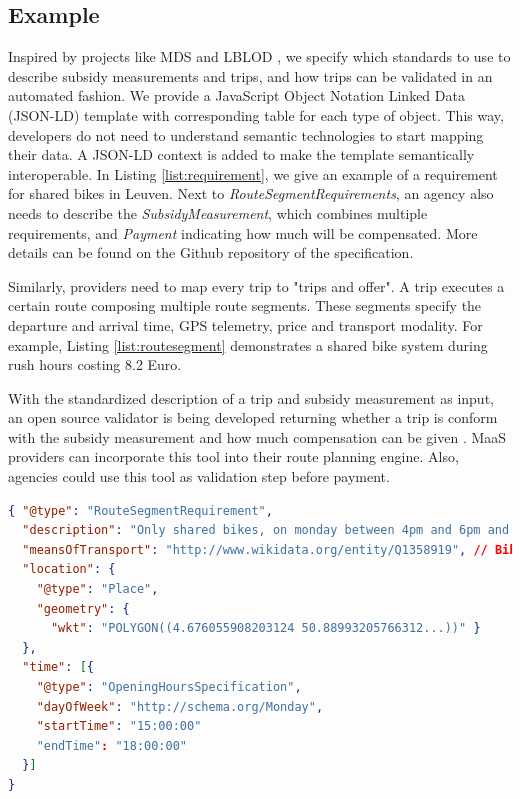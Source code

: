 \documentclass[runningheads]{llncs}
\begin{document}
\subsection{Example}

Inspired by projects like MDS \cite{mds} and LBLOD \cite{subsidymeasurement}, we specify which standards to use to describe subsidy measurements and trips, and how trips can be validated in an automated fashion. We provide a JavaScript Object Notation Linked Data (JSON-LD) template with corresponding table for each type of object. 
This way, developers do not need to understand semantic technologies to start mapping their data. A JSON-LD context is added to make the template semantically interoperable. 
In Listing \ref{list:requirement}, we give an example of a requirement for shared bikes in Leuven. Next to \emph{RouteSegmentRequirements}, an  agency also needs to describe the \emph{SubsidyMeasurement}, which combines multiple requirements, and \emph{Payment} indicating how much will be compensated. More details can be found on the Github repository of the specification\cite{tpp}. 

Similarly, providers need to map every trip to "trips and offer"\cite{tripsandoffer}. A trip executes a certain route composing multiple route segments. These segments specify the departure and arrival time, GPS telemetry, price and transport modality. For example, Listing  \ref{list:routesegment} demonstrates a shared bike system during rush hours costing 8.2 Euro. 

With the standardized description of a trip and subsidy measurement as input, an open source validator is being developed returning whether a trip is conform with the subsidy measurement and how much compensation can be given \cite{tpp}. MaaS providers can incorporate this tool into their route planning engine. Also, agencies could use this tool as validation step before payment.

\begin{lstlisting}[language=json, caption={Travellers are eligible for a subsidy measurement when they use a shared bicycle within the centre of Leuven and on a monday during rush hours.}, label={list:requirement}
]
{ "@type": "RouteSegmentRequirement",
  "description": "Only shared bikes, on monday between 4pm and 6pm and used in the city centre of Leuven.",
  "meansOfTransport": "http://www.wikidata.org/entity/Q1358919", // Bike
  "location": {
  	"@type": "Place",
    "geometry": {
      "wkt": "POLYGON((4.676055908203124 50.88993205766312...))" }
  },
  "time": [{
    "@type": "OpeningHoursSpecification",
    "dayOfWeek": "http://schema.org/Monday",
    "startTime": "15:00:00"
    "endTime": "18:00:00"
  }]
}
\end{lstlisting}
\end{document}
